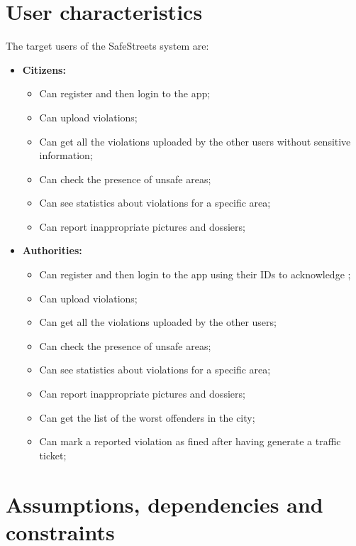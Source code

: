 \documentclass[../RASD.tex]{subfiles}
\begin{document}
    \section{User characteristics}\label{sec:user-characteristics}
    The target users of the SafeStreets system are:
    \begin{itemize}
        \item \textbf{Citizens:}
        \begin{itemize}
            \item Can register and then login to the app;
            \item Can upload violations;
            \item Can get all the violations uploaded by the other users  without sensitive information;
            \item Can check the presence of unsafe areas;
            \item Can see statistics about violations for a specific area;
            \item Can report inappropriate pictures and dossiers;
        \end{itemize}
        \item \textbf{Authorities:}
        \begin{itemize}
            \item Can register and then login to the app using their IDs to acknowledge ;
            \item Can upload violations;
            \item Can get all the violations uploaded by the other users;
            \item Can check the presence of unsafe areas;
            \item Can see statistics about violations for a specific area;
            \item Can report inappropriate pictures and dossiers;
            \item Can get the list of the worst offenders in the city;
            \item Can mark a reported violation as fined after having generate a traffic ticket;
        \end{itemize}
    \end{itemize}
    \section{Assumptions, dependencies and constraints}\label{sec:assumptions,-dependencies-and-constraints}
\end{document}
